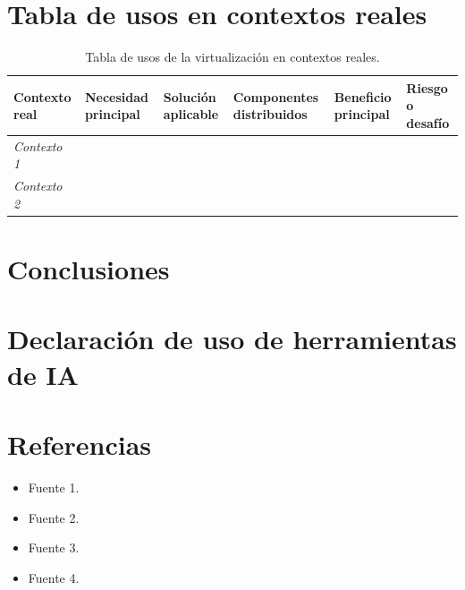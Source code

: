 \documentclass[12pt,a4paper]{article}
\begin{document}
\section{Tabla de usos en contextos reales}
\label{sec:tabla-usos}

\begin{table}[htbp]
  \caption{Tabla de usos de la virtualización en contextos reales.}
  \label{tab:usos-contexto}
  \footnotesize
  \renewcommand{\arraystretch}{1.5}
  \begin{tabularx}{\textwidth}{@{} Y Y Y Y Y Y @{}}
    \toprule
    \textbf{Contexto real}
      & \textbf{Necesidad principal}
      & \textbf{Solución aplicable}
      & \textbf{Componentes distribuidos}
      & \textbf{Beneficio principal}
      & \textbf{Riesgo o desafío} \\
    \midrule
    \textit{Contexto 1} & & & & & \\[2pt]
    \textit{Contexto 2} & & & & & \\
    \bottomrule
  \end{tabularx}
\end{table}

\section{Conclusiones}
\label{sec:conclusiones}

\section{Declaración de uso de herramientas de IA}
\label{sec:ia}

\section{Referencias}
\label{sec:referencias}
\begin{itemize}
  \item Fuente 1.
  \item Fuente 2.
  \item Fuente 3.
  \item Fuente 4.
\end{itemize}
\end{document}
